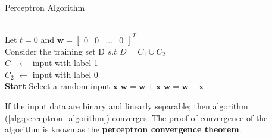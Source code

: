 \begin{algorithm}
\caption{Perceptron Algorithm}\label{alg:perceptron_algorithm}
\begin{algorithmic}[1]
\Require \\
Let $t=0$ and $\textbf{w} = \begin{bmatrix}
  0 & 0 & \dots & 0
\end{bmatrix}^T$ \\
Consider the training set D $s.t$ $D = C_1 \cup C_2$  \\
$C_1$ $\leftarrow$ input with label 1 \\
$C_2$ $\leftarrow$ input with label 0\\
\textbf{Start}
  \State Select a random input $\textbf{x}$
  \State $\textbf{w} = \textbf{w} + \textbf{x}$
  \EndIf
  \State $\textbf{w} = \textbf{w} - \textbf{x}$
  \EndIf
\EndWhile
\end{algorithmic}
\end{algorithm}
\noindent If the input data are binary and linearly separable; then algorithm (\ref{alg:perceptron_algorithm}) converges. The proof of convergence of the algorithm is known as the \textbf{perceptron convergence theorem}. \vspace{5mm}

